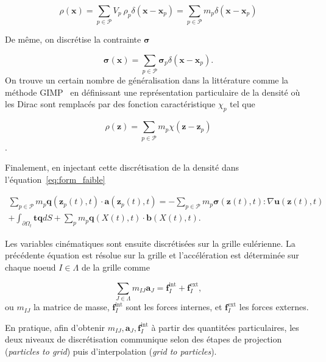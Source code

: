 \begin{equation*}
    \rho(\bm x) = \sum_{p \in \mathcal P} V_p~\rho_p \delta(\bm x - \bm x_p) = \sum_{p \in \mathcal P} m_p \delta(\bm x - \bm x_p)
\end{equation*}

De même, on discrétise la contrainte $\bm \sigma$

\begin{equation*}
    \bm \sigma(\bm x) = \sum_{p \in \mathcal P} \bm \sigma_p \delta(\bm x - \bm x_p).
\end{equation*}
On trouve un certain nombre de généralisation dans la littérature comme la méthode GIMP~\cite{bardenhagen_generalized_2004} en définissant une représentation particulaire de la densité où les Dirac sont remplacés par des fonction caractéristique $\chi_p$ tel que

\begin{equation*}
    \rho(\bm z) = \sum_{p \in \mathcal P} m_p \chi(\bm z - \bm z_p)
\end{equation*}.

Finalement, en injectant cette discrétisation de la densité dans l'équation~\eqref{eq:form_faible}

\begin{multline*}
    \sum_{p \in \mathcal P} m_p \bm q(\bm z_p(t), t)\cdot \bm a(\bm z_p(t), t) = - \sum_{p \in \mathcal P} m_p \bm \sigma(\bm z(t), t) : \nabla \bm u(\bm z(t), t) \\
    + \int_{\partial \Omega_t} \bm t \bm q dS + \sum_{p} m_p \bm q(X(t), t) \cdot \bm b(X(t), t).
\end{multline*}

Les variables cinématiques sont ensuite discrétisées sur la grille eulérienne. La précédente équation est résolue sur la grille et l'accélération est déterminée sur chaque noeud $I \in \Lambda$ de la grille comme

\begin{equation*}\label{eq:mpm_pfd}
    \sum_{J \in \Lambda} m_{IJ} \bm a_J = \bm f_I^{\text{int}} + \bm f_I^{\text{ext}},
\end{equation*}ou $m_{IJ}$ la matrice de masse, $\bm f_I^{\text{int}}$ sont les forces internes, et $\bm f_I^{\text{ext}}$ les forces externes.

En pratique, afin d'obtenir $m_{IJ},\bm a_J,\bm f_I^{\text{int}}$ à partir des quantitées particulaires, les deux niveaux de discrétisation communique selon des étapes de projection (\textit{particles to grid}) puis d'interpolation (\textit{grid to particles}).

